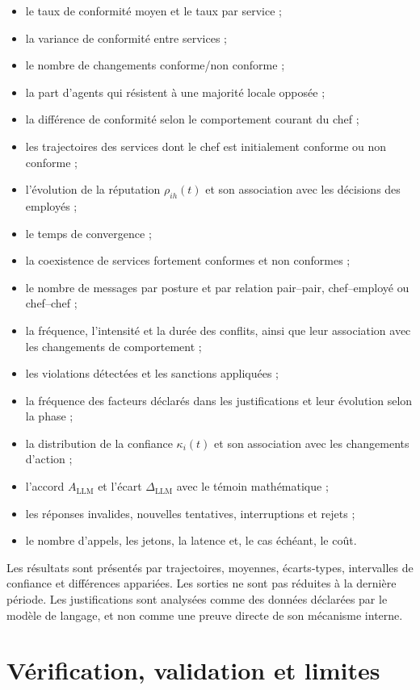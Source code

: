 \documentclass[10pt,a4paper]{article}
\begin{document}
\begin{itemize}
  \item le taux de conformité moyen et le taux par service ;
  \item la variance de conformité entre services ;
  \item le nombre de changements conforme/non conforme ;
  \item la part d’agents qui résistent à une majorité locale opposée ;
  \item la différence de conformité selon le comportement courant du chef ;
  \item les trajectoires des services dont le chef est initialement conforme
  ou non conforme ;
  \item l’évolution de la réputation $\rho_{ih}(t)$ et son association avec les
  décisions des employés ;
  \item le temps de convergence ;
  \item la coexistence de services fortement conformes et non conformes ;
  \item le nombre de messages par posture et par relation
  pair--pair, chef--employé ou chef--chef ;
  \item la fréquence, l’intensité et la durée des conflits, ainsi que leur
  association avec les changements de comportement ;
  \item les violations détectées et les sanctions appliquées ;
  \item la fréquence des facteurs déclarés dans les justifications et leur
  évolution selon la phase ;
  \item la distribution de la confiance $\kappa_i(t)$ et son association avec
  les changements d’action ;
  \item l’accord $A_{\mathrm{LLM}}$ et l’écart
  $\Delta_{\mathrm{LLM}}$ avec le témoin mathématique ;
  \item les réponses invalides, nouvelles tentatives, interruptions et rejets ;
  \item le nombre d’appels, les jetons, la latence et, le cas échéant, le coût.
\end{itemize}

Les résultats sont présentés par trajectoires, moyennes, écarts-types,
intervalles de confiance et différences appariées. Les sorties ne sont pas
réduites à la dernière période. Les justifications sont analysées comme des
données déclarées par le modèle de langage, et non comme une preuve directe de
son mécanisme interne.

\section{Vérification, validation et limites}
\end{document}
